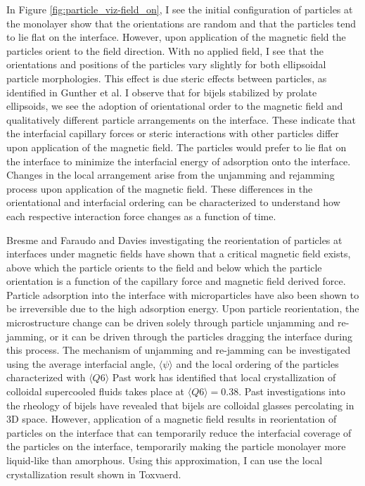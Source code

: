 In Figure \ref{fig:particle_viz-field_on}, I see the initial configuration of particles at the monolayer show that the orientations are random and that the 
particles tend to lie flat on the interface. However, upon application of the magnetic field the particles orient to the field direction. With no applied field,
I see that the orientations and positions of the particles vary slightly for both ellipsoidal particle morphologies. This effect is due steric effects between particles,
as identified in Gunther et al. \cite{gunther_timescales_2014} I observe that for bijels stabilized by prolate ellipsoids, we see the adoption of orientational order
to the magnetic field and qualitatively different particle arrangements on the interface. These indicate that the interfacial capillary forces or steric interactions 
with other particles differ upon application of the magnetic field. The particles would prefer to lie flat on the interface to minimize the interfacial energy of 
adsorption onto the interface. Changes in the local arrangement arise from the unjamming and rejamming process upon application of the magnetic field. These differences 
in the orientational and interfacial ordering can be characterized to understand how each respective interaction force changes as a function of time.

Bresme and Faraudo and Davies investigating the reorientation of particles at interfaces under magnetic fields have shown that a critical magnetic field exists, 
above which the particle orients to the field and below which the particle orientation is a function of the capillary force and magnetic field derived force. 
\cite{davies_interface_2014} \cite{bresme_orientational_2007} Particle adsorption into the interface with microparticles have also been shown to be irreversible due 
to the high adsorption energy. Upon particle reorientation, the microstructure change can be driven solely through particle unjamming and re-jamming, or it can be 
driven through the particles dragging the interface during this process. The mechanism of unjamming and re-jamming can be investigated using the average interfacial 
angle, $\langle \psi \rangle$ and the local ordering of the particles characterized with  $\langle Q6 \rangle$ Past work has identified that local crystallization 
of colloidal supercooled fluids takes place at \(\langle Q6 \rangle = 0.38\). \cite{toxvaerd_role_2020} Past investigations into the rheology of bijels have revealed
that bijels are colloidal glasses percolating in 3D space. \cite{ching_bijel_2022} However, application of a magnetic field results in reorientation of particles on
the interface that can temporarily reduce the interfacial coverage of the particles on the interface, temporarily making the particle monolayer more liquid-like
than amorphous. \cite{hunter_physics_2012} Using this approximation, I can use the local crystallization result shown in Toxvaerd.

